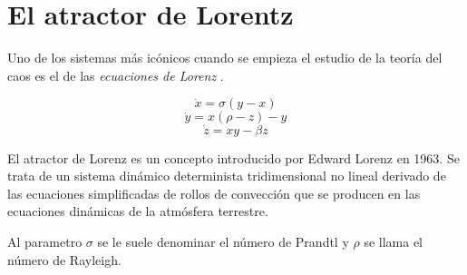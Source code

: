 \section{El atractor de Lorentz}
\label{El atractor de Lorentz}

Uno de los sistemas más icónicos cuando se empieza el estudio de la teoría del caos es el de las 
\emph{ecuaciones de Lorenz} . 

\begin{definition}
    \begin{equation}
        \dot{x} = \sigma (y-x) 
    \end{equation}
    \begin{equation}
        \dot{y} = x(\rho - z) - y 
    \end{equation}
    \begin{equation}
        \dot{z} = xy - \beta z
    \end{equation}
\end{definition}

El atractor de Lorenz es un concepto introducido por Edward Lorenz en 1963. Se trata de un sistema dinámico 
determinista tridimensional no lineal derivado de las ecuaciones simplificadas de rollos de convección que 
se producen en las ecuaciones dinámicas de la atmósfera terrestre.

Al parametro $\sigma$ se le suele denominar el número de Prandtl y $\rho$ se llama el número de Rayleigh.

